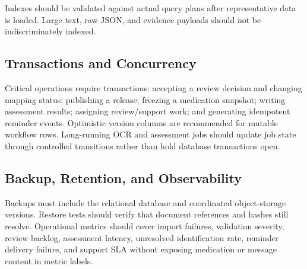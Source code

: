 Indexes should be validated against actual query plans after representative data is loaded. Large text, raw JSON, and evidence payloads should not be indiscriminately indexed.

\subsection{Transactions and Concurrency}

Critical operations require transactions: accepting a review decision and changing mapping status; publishing a release; freezing a medication snapshot; writing assessment results; assigning review/support work; and generating idempotent reminder events. Optimistic version columns are recommended for mutable workflow rows. Long-running OCR and assessment jobs should update job state through controlled transitions rather than hold database transactions open.

\subsection{Backup, Retention, and Observability}

Backups must include the relational database and coordinated object-storage versions. Restore tests should verify that document references and hashes still resolve. Operational metrics should cover import failures, validation severity, review backlog, assessment latency, unresolved identification rate, reminder delivery failure, and support SLA without exposing medication or message content in metric labels.


